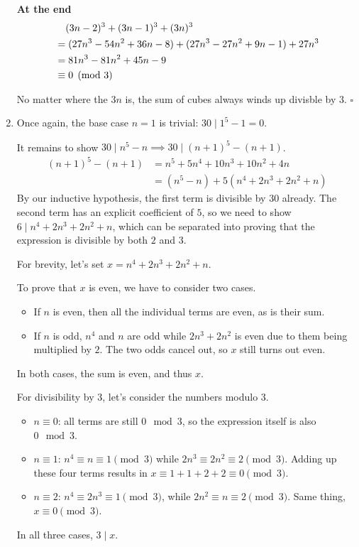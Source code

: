 \documentclass[12pt]{article}
\begin{document}
\begin{enumerate}
            \textbf{At the end}
            \begin{align*}
                   & \hphantom{={}} (3n-2)^3+(3n-1)^3+(3n)^3        \\
                   & = (27n^3-54n^2+36n-8)+(27n^3-27n^2+9n-1)+27n^3 \\
                   & = 81n^3-81n^2+45n-9                            \\
                   & \equiv 0 \pmod 3
            \end{align*}

            No matter where the $3n$ is, the sum of cubes always winds up
            divisble by $3$. $\square$

      \item Once again, the base case $n=1$ is trivial: $30 \mid 1^5-1=0$.

            It remains to show $30 \mid n^5-n \implies 30 \mid (n+1)^5-(n+1)$.
            \begin{align*}
                  (n+1)^5-(n+1)
                   & =n^5+5n^4+10n^3+10n^2+4n               \\
                   & =\left(n^5-n\right)+5(n^4+2n^3+2n^2+n)
            \end{align*}
            By our inductive hypothesis, the first term is divisible by $30$ already.
            The second term has an explicit coefficient of $5$, so we need to show
            $6 \mid n^4+2n^3+2n^2+n$, which can be separated into proving that
            the expression is divisible by both $2$ and $3$.

            For brevity, let's set $x=n^4+2n^3+2n^2+n$.

            To prove that $x$ is even, we have to consider two cases.
            \begin{itemize}[nolistsep]
                  \item If $n$ is even, then all the individual terms are even, as is their sum.
                  \item If $n$ is odd, $n^4$ and $n$ are odd while $2n^3+2n^2$ is even due to them being multiplied by $2$.
                        The two odds cancel out, so $x$ still turns out even.
            \end{itemize}
            In both cases, the sum is even, and thus $x$.

            For divisibility by $3$, let's consider the numbers modulo $3$.
            \begin{itemize}[nolistsep]
                  \item $n \equiv 0$: all terms are still $0 \mod 3$, so the expression itself is also $0 \mod 3$.
                  \item $n \equiv 1$: $n^4 \equiv n \equiv 1 \pmod 3$ while $2n^3 \equiv 2n^2 \equiv 2 \pmod 3$.
                        Adding up these four terms results in $x \equiv 1+1+2+2 \equiv 0 \pmod 3$.
                  \item $n \equiv 2$: $n^4 \equiv 2n^3 \equiv 1 \pmod 3$, while $2n^2 \equiv n \equiv 2 \pmod 3$.
                        Same thing, $x \equiv 0 \pmod 3$.
            \end{itemize}
            In all three cases, $3 \mid x$.


\end{enumerate}
\end{document}
